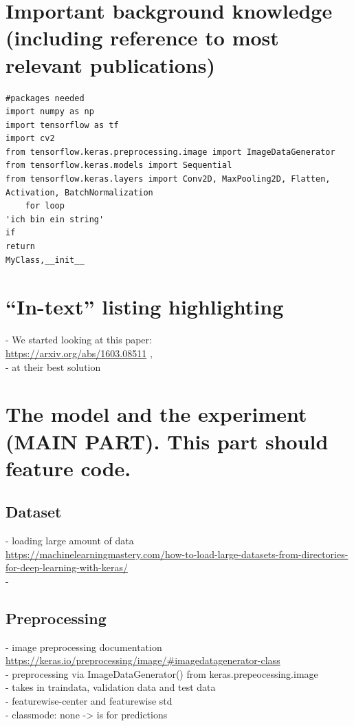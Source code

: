\documentclass[12pt,letterpaper]{article}
\begin{document}
\section{Important background knowledge (including reference to most relevant publications)}
\begin{lstlisting}
#packages needed
import numpy as np 
import tensorflow as tf 
import cv2
from tensorflow.keras.preprocessing.image import ImageDataGenerator
from tensorflow.keras.models import Sequential
from tensorflow.keras.layers import Conv2D, MaxPooling2D, Flatten, Activation, BatchNormalization
	for loop
'ich bin ein string'
if
return
MyClass,__init__
\end{lstlisting}

\section{``In-text'' listing highlighting}

- We started looking at this paper: \\
\url{https://arxiv.org/abs/1603.08511} , \\
- at their best solution
\section{The model and the experiment (MAIN PART). This part should feature code.}
\subsection{Dataset}
- loading large amount of data\\
\url{https://machinelearningmastery.com/how-to-load-large-datasets-from-directories-for-deep-learning-with-keras/}\\
- 
\subsection{Preprocessing}
- image preprocessing documentation\\
\url{https://keras.io/preprocessing/image/#imagedatagenerator-class}\\
- preprocessing via ImageDataGenerator() from keras.prepeocessing.image\\
- takes in traindata, validation data and test data\\
- featurewise-center and featurewise std\\
- classmode: none -> is for predictions\\
\end{document}
